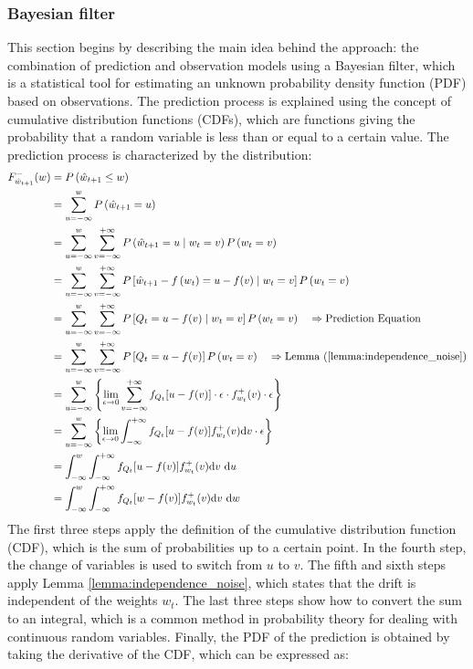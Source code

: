 \subsubsection{Bayesian filter}
This section begins by describing the main idea behind the approach: the combination of prediction and observation models using a Bayesian filter, which is a statistical tool for estimating an unknown probability density function (PDF) based on observations. The prediction process is explained using the concept of cumulative distribution functions (CDFs), which are functions giving the probability that a random variable is less than or equal to a certain value. The prediction process is characterized by the distribution:
\begin{equation}
   \begin{aligned}
   F_{\hat{w}_{t+1}}^{-}(w) &=P\left(\hat{w}_{t+1} \leq w\right) \\
   &=\sum_{u=-\infty}^w P\left(\hat{w}_{t+1}=u\right)\\
   &=\sum_{u=-\infty}^w \sum_{v=-\infty}^{+\infty} P\left(\hat{w}_{t+1}=u \mid w_t=v\right) P\left(w_t=v\right)\\
   &=\sum_{u=-\infty}^w \sum_{v=-\infty}^{+\infty} P\left[\hat{w}_{t+1}-f\left(w_t\right)=u-f(v) \mid w_t=v\right] P\left(w_t=v\right)\\
   &=\sum_{u=-\infty}^w \sum_{v=-\infty}^{+\infty} P\left[Q_t=u-f(v) \mid w_t=v\right] P\left(w_t=v\right)  \quad \Rightarrow \text{Prediction Equation} \\
   &=\sum_{u=-\infty}^w \sum_{v=-\infty}^{+\infty} P\left[Q_t=u-f(v)\right] P\left(w_t=v\right) \quad \Rightarrow \text{Lemma (\ref{lemma:independence_noise}}) \\
   &=\sum_{u=-\infty}^w\left\{\lim _{\epsilon \rightarrow 0} \sum_{v=-\infty}^{+\infty} f_{Q_t}[u-f(v)] \cdot \epsilon \cdot f_{w_t}^{+}(v) \cdot \epsilon\right\}\\
   &=\sum_{u=-\infty}^w\left\{\lim _{\epsilon \rightarrow 0} \int_{-\infty}^{+\infty} f_{Q_t}[u-f(v)] f_{w_t}^{+}(v) \mathrm{d} v \cdot \epsilon\right\}\\
   &=\int_{-\infty}^w \int_{-\infty}^{+\infty} f_{Q_t}[u-f(v)] f_{w_t}^{+}(v) \mathrm{d} v \mathrm{~d} u\\
   &=\int_{-\infty}^w \int_{-\infty}^{+\infty} f_{Q_t}[w-f(v)] f_{w_t}^{+}(v) \mathrm{d} v \mathrm{~d} w
   \end{aligned}
   \end{equation}
The first three steps apply the definition of the cumulative distribution function (CDF), which is the sum of probabilities up to a certain point. In the fourth step, the change of variables is used to switch from $u$ to $v$. The fifth and sixth steps apply Lemma \ref{lemma:independence_noise}, which states that the drift is independent of the weights $w_t$. The last three steps show how to convert the sum to an integral, which is a common method in probability theory for dealing with continuous random variables. Finally, the PDF of the prediction is obtained by taking the derivative of the CDF, which can be expressed as:
